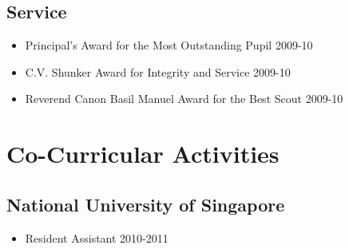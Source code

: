 \documentclass[11pt,a4paper]{moderncv}
\begin{document}
\subsection{Service}
\begin{itemize}
\item Principal's Award for the Most Outstanding Pupil \hfill 2009-10
\item C.V. Shunker Award for Integrity and Service \hfill 2009-10
\item Reverend Canon Basil Manuel Award for the Best Scout \hfill 2009-10
\end{itemize}
\begin{comment}
\subsection{Boy Scouts}
\item Best Scout Camper in Annual Scouts and Cubs Winter Camp \hfill 2006
\item Winner of Annual Hechle Ambulance Shield First Aid Competition \hfill 2008
\item First Runner Up of Annual Scouts and Guides Quiz Competition \hfill 2007
\end{comment}
\section{Co-Curricular Activities}
\subsection{National University of Singapore}
\begin{itemize}
    \item Resident Assistant \hfill 2010-2011
\end{itemize}
\end{document}
